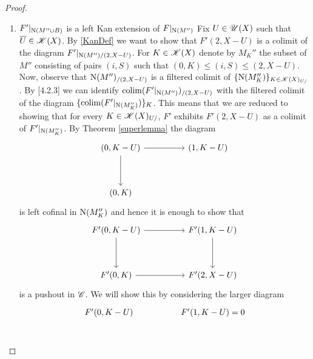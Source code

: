 \documentclass[../../thesis.tex]{subfiles}
\begin{document}
\begin{proof}
\begin{enumerate}[label=(\alph*)]
        \item $F'|_{\mathrm{N}(M'' \cup B)}$ is a left Kan extension of $F|_{\mathrm{N}(M'')}$
              Fix $U \in \mathscr{U}(X)$ such that $\overline{U} \in \mathscr{K}(X)$. By \ref{KanDef} we want to show that $F'(2, X-U)$ is a colimit of the diagram $F'|_{\mathrm{N}(M'')/(2,X-U)}$.
              For $K \in \mathscr{K}(X)$ denote by $M_K''$ the subset of $M''$ consisting of pairs $(i,S)$ such that $(0,K)\leq (i,S) \leq (2,X-U)$.
              Now, observe that $\mathrm{N}(M'')_{/(2,X-U)}$ is a filtered colimit of $\{\mathrm{N}(M_K'')\}_{K\in \mathscr{K}(X)_{U/}}$.
              By \cite{HTT}[4.2.3] we can identify $\operatorname{colim}(F'|_{\mathrm{N}(M'')})_{/(2,X-U)}$ with the filtered colimit of the diagram $\{\operatorname{colim}(F'|_{\mathrm{N}(M_K'')})\}_K$.
              This means that we are reduced to showing that for every $K \in \mathscr{K}(X)_{U/}$, $F'$ exhibits $F'(2,X-U)$ as a colimit of $F'|_{\mathrm{N}(M_K'')}$.
              By Theorem \ref{superlemma} the diagram
              \[\begin{tikzcd}
                      {(0,K-U)} && {(1,K-U)} \\
                      \\
                      {(0,K)}
                      \arrow[from=1-1, to=1-3]
                      \arrow[from=1-1, to=3-1]
                  \end{tikzcd}\]
              is left cofinal in $\mathrm{N}(M_K'')$ and hence it is enough to show that
              \[\begin{tikzcd}
                      {F'(0,K-U)} && {F'(1,K-U)} \\
                      \\
                      {F'(0,K)} && {F'(2,X-U)}
                      \arrow[from=1-1, to=1-3]
                      \arrow[from=1-1, to=3-1]
                      \arrow[from=1-3, to=3-3]
                      \arrow[from=3-1, to=3-3]
                  \end{tikzcd}\]
              is a pushout in $\mathscr{C}$.
              We will show this by considering the larger diagram
              \[\begin{tikzcd}
                      {F'(0,K-U)} && {F'(1,K-U) = 0} \\

\end{tikzcd}\]
\end{enumerate}
\end{proof}
\end{document}
